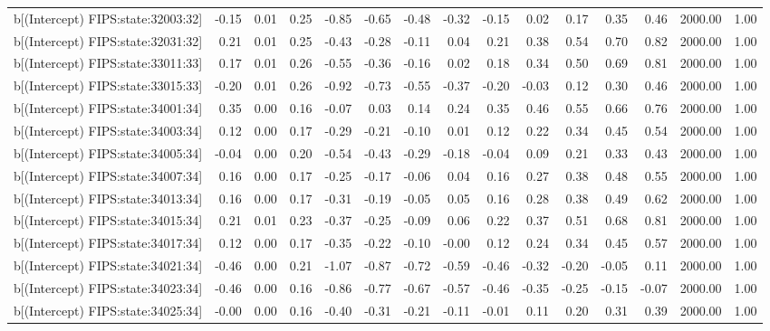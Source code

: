 \begin{table}[ht]
\begin{tabular}{rrrrrrrrrrrrrrr}
  b[(Intercept) FIPS:state:32003:32] & -0.15 & 0.01 & 0.25 & -0.85 & -0.65 & -0.48 & -0.32 & -0.15 & 0.02 & 0.17 & 0.35 & 0.46 & 2000.00 & 1.00 \\ 
  b[(Intercept) FIPS:state:32031:32] & 0.21 & 0.01 & 0.25 & -0.43 & -0.28 & -0.11 & 0.04 & 0.21 & 0.38 & 0.54 & 0.70 & 0.82 & 2000.00 & 1.00 \\ 
  b[(Intercept) FIPS:state:33011:33] & 0.17 & 0.01 & 0.26 & -0.55 & -0.36 & -0.16 & 0.02 & 0.18 & 0.34 & 0.50 & 0.69 & 0.81 & 2000.00 & 1.00 \\ 
  b[(Intercept) FIPS:state:33015:33] & -0.20 & 0.01 & 0.26 & -0.92 & -0.73 & -0.55 & -0.37 & -0.20 & -0.03 & 0.12 & 0.30 & 0.46 & 2000.00 & 1.00 \\ 
  b[(Intercept) FIPS:state:34001:34] & 0.35 & 0.00 & 0.16 & -0.07 & 0.03 & 0.14 & 0.24 & 0.35 & 0.46 & 0.55 & 0.66 & 0.76 & 2000.00 & 1.00 \\ 
  b[(Intercept) FIPS:state:34003:34] & 0.12 & 0.00 & 0.17 & -0.29 & -0.21 & -0.10 & 0.01 & 0.12 & 0.22 & 0.34 & 0.45 & 0.54 & 2000.00 & 1.00 \\ 
  b[(Intercept) FIPS:state:34005:34] & -0.04 & 0.00 & 0.20 & -0.54 & -0.43 & -0.29 & -0.18 & -0.04 & 0.09 & 0.21 & 0.33 & 0.43 & 2000.00 & 1.00 \\ 
  b[(Intercept) FIPS:state:34007:34] & 0.16 & 0.00 & 0.17 & -0.25 & -0.17 & -0.06 & 0.04 & 0.16 & 0.27 & 0.38 & 0.48 & 0.55 & 2000.00 & 1.00 \\ 
  b[(Intercept) FIPS:state:34013:34] & 0.16 & 0.00 & 0.17 & -0.31 & -0.19 & -0.05 & 0.05 & 0.16 & 0.28 & 0.38 & 0.49 & 0.62 & 2000.00 & 1.00 \\ 
  b[(Intercept) FIPS:state:34015:34] & 0.21 & 0.01 & 0.23 & -0.37 & -0.25 & -0.09 & 0.06 & 0.22 & 0.37 & 0.51 & 0.68 & 0.81 & 2000.00 & 1.00 \\ 
  b[(Intercept) FIPS:state:34017:34] & 0.12 & 0.00 & 0.17 & -0.35 & -0.22 & -0.10 & -0.00 & 0.12 & 0.24 & 0.34 & 0.45 & 0.57 & 2000.00 & 1.00 \\ 
  b[(Intercept) FIPS:state:34021:34] & -0.46 & 0.00 & 0.21 & -1.07 & -0.87 & -0.72 & -0.59 & -0.46 & -0.32 & -0.20 & -0.05 & 0.11 & 2000.00 & 1.00 \\ 
  b[(Intercept) FIPS:state:34023:34] & -0.46 & 0.00 & 0.16 & -0.86 & -0.77 & -0.67 & -0.57 & -0.46 & -0.35 & -0.25 & -0.15 & -0.07 & 2000.00 & 1.00 \\ 
  b[(Intercept) FIPS:state:34025:34] & -0.00 & 0.00 & 0.16 & -0.40 & -0.31 & -0.21 & -0.11 & -0.01 & 0.11 & 0.20 & 0.31 & 0.39 & 2000.00 & 1.00 \\ 

\end{tabular}
\end{table}
